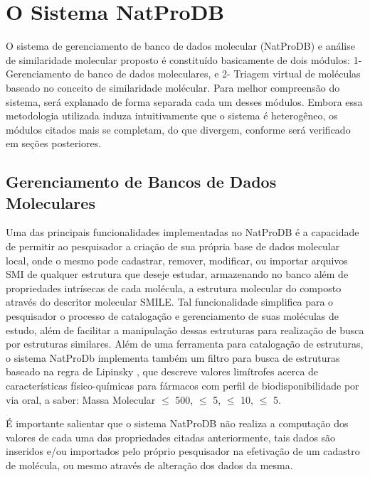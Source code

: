 \chapter{O Sistema NatProDB}
\label{chap:natprodb}

O sistema de gerenciamento de banco de dados molecular (NatProDB) e análise de similaridade molecular proposto é constituído basicamente de dois módulos: 1- Gerenciamento de banco de dados moleculares, e 2- Triagem virtual de moléculas baseado no conceito de similaridade molécular. Para melhor compreensão do sistema, será explanado de forma separada cada um desses módulos. Embora essa metodologia utilizada induza intuitivamente que o sistema é heterogêneo, os módulos citados mais se completam, do que divergem, conforme será verificado em seções posteriores.

\section{Gerenciamento de Bancos de Dados Moleculares}

Uma das principais funcionalidades implementadas no NatProDB é a capacidade de permitir ao pesquisador a criação de sua própria base de dados molecular local, onde o mesmo pode cadastrar, remover, modificar, ou importar arquivos SMI de qualquer estrutura que deseje estudar, armazenando no banco além de propriedades intrísecas de cada molécula, a estrutura molecular do composto através do descritor molecular SMILE. Tal funcionalidade simplifica para o pesquisador o processo de catalogação e gerenciamento de suas moléculas de estudo, além de facilitar a manipulação dessas estruturas para realização de busca por estruturas similares.   
Além de uma ferramenta para catalogação de estruturas, o sistema NatProDb implementa também um filtro para busca de estruturas baseado na regra de Lipinsky \cite{lipinski2012experimental}, que descreve valores limítrofes acerca de características físico-químicas para fármacos com perfil de biodisponibilidade por via oral, a saber: Massa Molecular $\leq$ 500,   $\leq$ 5,  $\leq$ 10,  $\leq$ 5.

É importante salientar que o sistema NatProDB não realiza a computação dos valores de cada uma das propriedades citadas anteriormente, tais dados são inseridos e/ou importados pelo próprio pesquisador na efetivação de um cadastro de molécula, ou mesmo através de alteração dos dados da mesma.

